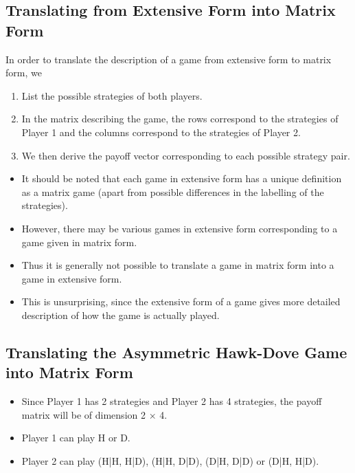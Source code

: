 \documentclass[]{report}
\begin{document}
\subsection{Translating from Extensive Form into Matrix Form}
In order to translate the description of a game from extensive form
to matrix form, we
\begin{enumerate}
\item  List the possible strategies of both players.
\item In the matrix describing the game, the rows
correspond to the strategies of Player 1 and the
columns correspond to the strategies of Player 2.
\item We then derive the payoff vector corresponding to
each possible strategy pair.
\end{enumerate}
\begin{itemize}
	\item It should be noted that each game in extensive form has a unique
	definition as a matrix game (apart from possible differences in the
	labelling of the strategies).
\item However, there may be various games in extensive form
	corresponding to a game given in matrix form. 
\item Thus it is generally
	not possible to translate a game in matrix form into a game in
	extensive form.
\item This is unsurprising, since the extensive form of a game gives more
	detailed description of how the game is actually played.
\end{itemize}


\subsection{Translating the Asymmetric Hawk-Dove Game into Matrix
Form}
\begin{itemize}
	\item Since Player 1 has 2 strategies and Player 2 has 4 strategies, the
	payoff matrix will be of dimension 2 × 4.
	\item Player 1 can play H or D.
	\item 	Player 2 can play (H|H, H|D), (H|H, D|D), (D|H, D|D) or
	(D|H, H|D). 
\end{itemize}
\end{document}
